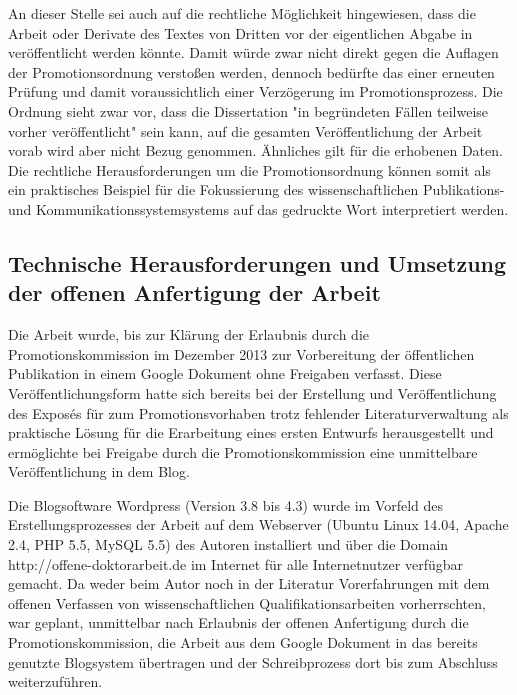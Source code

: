 An dieser Stelle sei auch auf die rechtliche Möglichkeit hingewiesen, dass die Arbeit oder Derivate des Textes von Dritten vor der eigentlichen Abgabe in veröffentlicht werden könnte. Damit würde zwar nicht direkt gegen die Auflagen der Promotionsordnung verstoßen werden, dennoch bedürfte das einer erneuten Prüfung und damit voraussichtlich einer Verzögerung im Promotionsprozess. Die Ordnung sieht zwar vor, dass die Dissertation "in begründeten Fällen teilweise vorher veröffentlicht" \cite{promotionsordnung_leuphana_kuwi_2011} sein kann, auf die gesamten Veröffentlichung der Arbeit vorab wird aber nicht Bezug genommen. Ähnliches gilt für die erhobenen Daten. Die rechtliche Herausforderungen um die Promotionsordnung können somit als ein praktisches Beispiel für die Fokussierung des wissenschaftlichen Publikations- und Kommunikationssystemsystems auf das gedruckte Wort interpretiert werden.

\subsection{Technische Herausforderungen und Umsetzung der offenen Anfertigung der Arbeit}

Die Arbeit wurde, bis zur Klärung der Erlaubnis durch die Promotionskommission im Dezember 2013 zur Vorbereitung der öffentlichen Publikation in einem Google Dokument ohne Freigaben verfasst. Diese Veröffentlichungsform hatte sich bereits bei der Erstellung und Veröffentlichung des Exposés für zum Promotionsvorhaben \cite{heise_2012_expose} trotz fehlender Literaturverwaltung als praktische Lösung für die Erarbeitung eines ersten Entwurfs herausgestellt und ermöglichte bei Freigabe durch die Promotionskommission eine unmittelbare Veröffentlichung in dem Blog.

Die Blogsoftware Wordpress (Version 3.8 bis 4.3) wurde im Vorfeld des Erstellungsprozesses der Arbeit auf dem Webserver (Ubuntu Linux 14.04, Apache 2.4, PHP 5.5, MySQL 5.5) des Autoren installiert und über die Domain http://offene-doktorarbeit.de im Internet für alle Internetnutzer verfügbar gemacht. Da weder beim Autor noch in der Literatur Vorerfahrungen mit dem offenen Verfassen von wissenschaftlichen Qualifikationsarbeiten vorherrschten, war geplant, unmittelbar nach Erlaubnis der offenen Anfertigung durch die Promotionskommission, die Arbeit aus dem Google Dokument in das bereits genutzte Blogsystem übertragen und der Schreibprozess dort bis zum Abschluss weiterzuführen.

